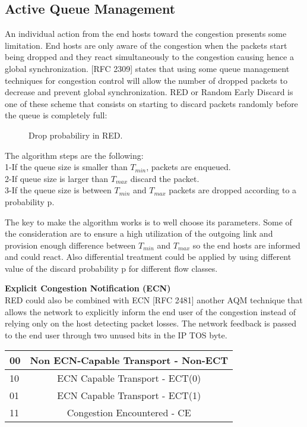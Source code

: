 \subsection{Active Queue Management}

An individual action from the end hosts toward the congestion presents some limitation. End hosts are only aware of the congestion when the packets start being dropped and they react simultaneously to the congestion causing hence a global synchronization. [RFC 2309] states that using some queue management techniques for congestion control will allow the number of dropped packets to decrease and prevent global synchronization. 
RED or Random Early Discard is one of these scheme that consists on starting to discard packets randomly before the queue is completely full:

 \begin{figure}[h]
  \begin{center}
\caption{
  Drop probabiliry in RED.
    \label{fig:RED}
}
 \end{center}
\end{figure}

The algorithm steps are the following:\\
1-If the queue size is smaller than $T_{min}$, packets are enqueued.\\
2-If queue size is larger than $T_{max}$ discard the packet.\\
3-If the queue size is between $T_{min}$ and $T_{max}$ packets are dropped according to a probability p.

The key to make the algorithm works is to well choose its parameters. Some of the consideration are to ensure a high utilization of the outgoing link and provision enough difference between $T_{min}$ and $T_{max}$ so the end hosts are informed and could react. Also differential treatment could be applied by using different value of the discard probability p for different flow classes. 

{\bf Explicit Congestion Notification (ECN)}
\\RED could also be combined with ECN [RFC 2481] another AQM technique that allows the network to explicitly inform the end user of the congestion instead of relying only on the host detecting packet losses. The network feedback is passed to the end user through two unused bits in the IP TOS byte. \\

\begin{center}
\begin{tabular}{| l | c| } \hline 
00 & Non ECN-Capable Transport - Non-ECT \\ \hline 
10 & ECN Capable Transport - ECT(0) \\ \hline 
01 & ECN Capable Transport - ECT(1) \\ \hline 
11 & Congestion Encountered - CE  \\ \hline 
\end{tabular}
\\
\caption{
  ECN codepoint.
    \label{fig:ECN}
}
\end{center}

